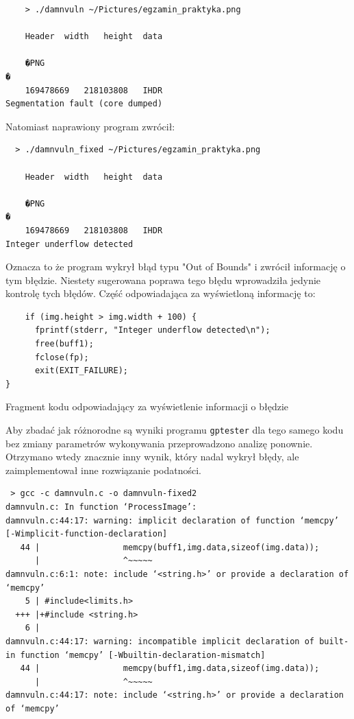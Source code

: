 \begin{verbatim}
    > ./damnvuln ~/Pictures/egzamin_praktyka.png 

	Header	width	height	data	

	�PNG
�
	169478669	218103808	IHDR
Segmentation fault (core dumped)
\end{verbatim}

Natomiast naprawiony program zwrócił:
\begin{verbatim}
  > ./damnvuln_fixed ~/Pictures/egzamin_praktyka.png 

	Header	width	height	data	

	�PNG
�
	169478669	218103808	IHDR
Integer underflow detected
\end{verbatim}

Oznacza to że program wykrył błąd typu "Out of Bounds" i zwrócił informację o tym błędzie. Niestety sugerowana poprawa tego błędu wprowadziła jedynie kontrolę tych błędów.
Część odpowiadająca za wyświetloną informację to:
\begin{listing}
  \begin{verbatim}
    if (img.height > img.width + 100) {
      fprintf(stderr, "Integer underflow detected\n");
      free(buff1);
      fclose(fp);
      exit(EXIT_FAILURE);
}
\end{verbatim}
\caption{Fragment kodu odpowiadający za wyświetlenie informacji o błędzie}
\label{lst:code3}
\end{listing}

Aby zbadać jak różnorodne są wyniki programu \texttt{gptester} dla tego samego kodu bez zmiany parametrów wykonywania przeprowadzono analizę ponownie. Otrzymano wtedy znacznie inny wynik, który nadal wykrył błędy, ale zaimplementował inne rozwiązanie podatności. 

\begin{verbatim}
 > gcc -c damnvuln.c -o damnvuln-fixed2
damnvuln.c: In function ‘ProcessImage’:
damnvuln.c:44:17: warning: implicit declaration of function ‘memcpy’ [-Wimplicit-function-declaration]
   44 |                 memcpy(buff1,img.data,sizeof(img.data));
      |                 ^~~~~~
damnvuln.c:6:1: note: include ‘<string.h>’ or provide a declaration of ‘memcpy’
    5 | #include<limits.h>
  +++ |+#include <string.h>
    6 | 
damnvuln.c:44:17: warning: incompatible implicit declaration of built-in function ‘memcpy’ [-Wbuiltin-declaration-mismatch]
   44 |                 memcpy(buff1,img.data,sizeof(img.data));
      |                 ^~~~~~
damnvuln.c:44:17: note: include ‘<string.h>’ or provide a declaration of ‘memcpy’

\end{verbatim}

